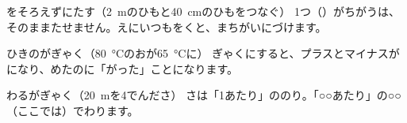 
\begin{tsumazuki}{をそろえずにたす（\qty{2}{m}のひもと\qty{40}{cm}のひもをつなぐ）}
1つ（）がちがうは、そのままたせません。えにいつもをくと、まちがいにづけます。
\end{tsumazuki}

\begin{tsumazuki}{ひきのがぎゃく（\qty{80}{\degreeCelsius}のおが\qty{65}{\degreeCelsius}に）}
ぎゃくにすると、プラスとマイナスがになり、めたのに「がった」ことになります。
\end{tsumazuki}

\begin{tsumazuki}{わるがぎゃく（\qty{20}{m}を4でんださ）}
さは「1あたり」ののり。「○○あたり」の○○（ここでは）でわります。
\end{tsumazuki}


